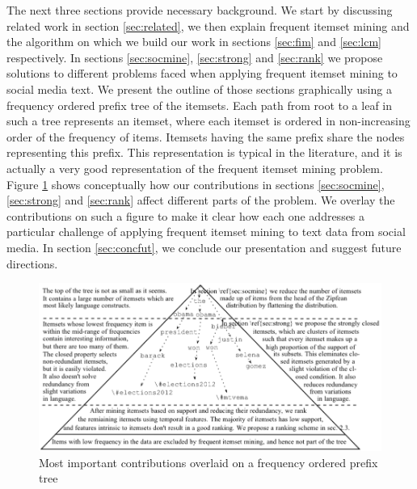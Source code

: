 \documentclass[letterpaper,12pt,titlepage,oneside,final]{book}
\begin{document}
The next three sections provide necessary background.
We start by discussing related work in section \ref{sec:related},
we then explain frequent itemset mining and the algorithm on which we build
our work in sections \ref{sec:fim} and \ref{sec:lcm} respectively.
In sections \ref{sec:socmine}, \ref{sec:strong} and \ref{sec:rank} we
propose solutions to different problems faced when applying frequent
itemset mining to social media text.
We present the outline of those sections graphically using a
frequency ordered prefix tree of the itemsets.
Each path from root to a leaf in such a tree represents an itemset,
where each itemset is ordered in non-increasing order of the frequency of
items.
Itemsets having the same prefix share the nodes representing this prefix.
This representation is typical in the literature, and it is actually a very
good representation of the frequent itemset mining problem.
Figure \ref{fig:outline} shows conceptually how our contributions in sections  \ref{sec:socmine},
\ref{sec:strong} and \ref{sec:rank}  affect different parts of the
problem. We overlay the contributions on such a figure to make it clear how each one addresses a particular challenge of applying frequent itemset mining to text data from social media. In section \ref{sec:concfut}, we conclude our presentation and
suggest future directions.

\begin{figure}
\centering
\includegraphics{pyramid-road-map.png}

\caption{Most important contributions overlaid on a frequency ordered prefix tree}
\label{fig:outline}
\end{figure}
\end{document}
